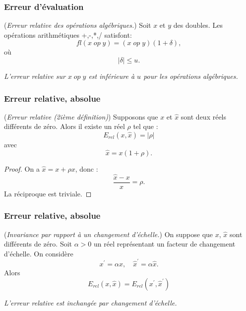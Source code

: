 \documentclass{beamer}
\begin{document}

\begin{frame}
\frametitle{Erreur d'évaluation}

\begin{theorem}
(\emph{Erreur relative des opérations algébriques.})
Soit $x$ et $y$ des doubles. 
Les opérations arithmétiques +,-,*,/ satisfont:
$$
fl(x \; op \; y)=(x\; op\; y) (1+\delta),
$$
où
$$
|\delta|\leq u.
$$
\end{theorem}

\emph{L'erreur relative sur $x\; op\; y$ est inférieure à $u$ 
pour les opérations algébriques.}

\end{frame}


\begin{frame}
\frametitle{Erreur relative, absolue}


\begin{theorem}
(\emph{Erreur relative (2ième définition)})
Supposons que $x$ et $\hat{x}$ sont deux réels différents de zéro. 
Alors il existe un réel $\rho$ tel que :
$$
E_{rel}(x,\hat{x}) = |\rho|
$$
avec 
$$
\hat{x} = x(1+\rho).
$$
\end{theorem}

\begin{proof}
On a $\hat{x} = x + \rho x$, donc :
$$
\frac{\hat{x}-x}{x} = \rho.
$$
La réciproque est triviale.
\end{proof}

\end{frame}


\begin{frame}
\frametitle{Erreur relative, absolue}


\begin{theorem}
(\emph{Invariance par rapport à un changement d'échelle.})
On suppose que $x$, $\hat{x}$ sont différents de zéro.
Soit $\alpha>0$ un réel représentant un facteur de changement d'échelle. 
On considère 
$$
x^\prime=\alpha x, \quad \hat{x}^\prime=\alpha \hat{x}.
$$
Alors 
$$
E_{rel}(x,\hat{x}) = E_{rel}(x^\prime,\hat{x}^\prime)
$$
\end{theorem}

\emph{L'erreur relative est inchangée par changement d'échelle.}

\end{frame}
\end{document}
